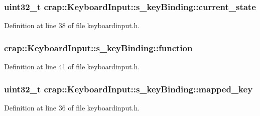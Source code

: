 \subsubsection[{current\+\_\+state}]{\setlength{\rightskip}{0pt plus 5cm}uint32\+\_\+t crap\+::\+Keyboard\+Input\+::s\+\_\+key\+Binding\+::current\+\_\+state}\label{structcrap_1_1_keyboard_input_1_1s__key_binding_a61b968c561b8c38e6f2d3915cdec8d9e}


Definition at line 38 of file keyboardinput.\+h.

\hypertarget{structcrap_1_1_keyboard_input_1_1s__key_binding_acf149623f1efc9e7cf13e2162db08862}{}
\subsubsection[{function}]{ crap\+::\+Keyboard\+Input\+::s\+\_\+key\+Binding\+::function}\label{structcrap_1_1_keyboard_input_1_1s__key_binding_acf149623f1efc9e7cf13e2162db08862}


Definition at line 41 of file keyboardinput.\+h.

\hypertarget{structcrap_1_1_keyboard_input_1_1s__key_binding_a7db8edac7a98cc852bf3a5dfa0fe8f08}{}
\subsubsection[{mapped\+\_\+key}]{\setlength{\rightskip}{0pt plus 5cm}uint32\+\_\+t crap\+::\+Keyboard\+Input\+::s\+\_\+key\+Binding\+::mapped\+\_\+key}\label{structcrap_1_1_keyboard_input_1_1s__key_binding_a7db8edac7a98cc852bf3a5dfa0fe8f08}


Definition at line 36 of file keyboardinput.\+h.

\hypertarget{structcrap_1_1_keyboard_input_1_1s__key_binding_aa0b547245a3a8a5ac28e5fb7b9321725}{}
